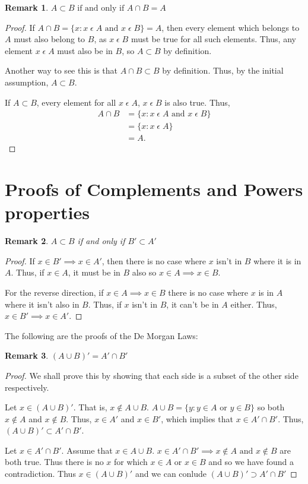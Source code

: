 \documentclass[12pt]{article}
\newtheorem{remark}{Remark}
\begin{document}
\begin{remark}
    $A \subset B \text{ if and only if } A \cap B = A$
\end{remark}
\begin{proof}
    If $A \cap B = \{x: x\;\epsilon\;A\text{ and } x\;\epsilon\;B\} = A$, then every element
    which belongs to $A$ must also belong to $B$, as $x\;\epsilon\;B$ must be true for all such elements.
    Thus, any element $x\;\epsilon\;A$ must also be in $B$, so $A \subset B$ by definition.

    Another way to see this is that $A \cap B \subset B$ by definition. Thus, by the initial assumption, $A \subset B$.

    If $A\subset B$, every element for all $x\;\epsilon\;A$, $x\;\epsilon\;B$ is also true. Thus,
    \begin{align*}
        A \cap B &= \{x: x\;\epsilon\;A\text{ and } x\;\epsilon\;B\}\\
                 &= \{x: x\;\epsilon\;A\}\\
                 &= A.
    \end{align*}
\end{proof}

\section{Proofs of Complements and Powers properties}\label{Appendix: Complements and Powers proofs}
\begin{remark}
    $A \subset B$ if and only if $B' \subset A'$
\end{remark}
\begin{proof}
    If $x \in B' \implies x \in A'$, then there is no case where $x$ isn't in $B$ where it is in $A$.
    Thus, if $x \in A$, it must be in $B$ also so $x \in A \implies x \in B$.

    For the reverse direction, if $x \in A \implies x \in B$ there is no case where $x$ is in $A$ where it isn't also
    in $B$. Thus, if $x$ isn't in $B$, it can't be in $A$ either. Thus, $x \in B' \implies x \in A'$.
\end{proof}

The following are the proofs of the De Morgan Laws:
\begin{remark}
    $(A \cup B)' = A' \cap B'$
\end{remark}
\begin{proof}
    We shall prove this by showing that each side is a subset of the other side respectively.

    Let $x \in (A \cup B)'$. That is, $x \notin A \cup B$. $A \cup B = \{y: y \in A \text{ or } y \in B\}$
    so both $x \notin A$ and $x \notin B$. Thus, $x \in A'$ and $x \in B'$, which implies that
    $x \in A' \cap B'$. Thus, $(A \cup B)' \subset A' \cap B'$.

    Let $x \in A' \cap B'$. Assume that $x \in A \cup B$. $x \in A' \cap B' \implies x \notin A \text{ and }
    x \notin B$ are both true. Thus there is no $x$ for which $x \in A$ or $x \in B$ and so we have found
    a contradiction. Thus $x \in (A \cup B)'$ and we can conlude $(A \cup B)' \supset A' \cap B'$
\end{proof}
\end{document}
